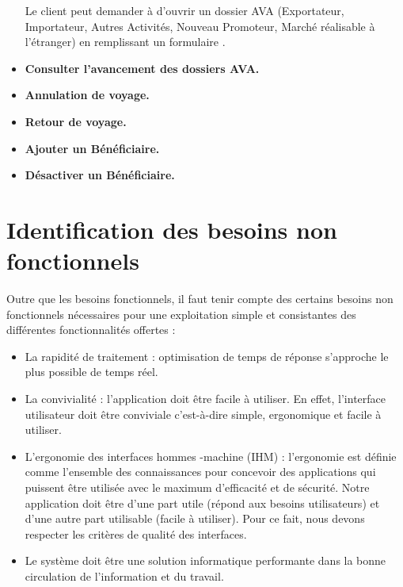 \begin{itemize}
Le client peut  demander à d'ouvrir un dossier AVA (Exportateur, Importateur, Autres Activités, Nouveau Promoteur, Marché réalisable à l'étranger) en remplissant un formulaire .

\item \textbf{Consulter l'avancement des dossiers AVA.}

\item \textbf{Annulation de voyage.} 

\item \textbf{Retour de voyage.} 

\item \textbf{Ajouter un Bénéficiaire.}

\item \textbf{Désactiver un Bénéficiaire.}


\end{itemize}
 
 \section{Identification des besoins non fonctionnels} 
 Outre que les besoins fonctionnels, il faut tenir compte des certains besoins non fonctionnels nécessaires pour une exploitation simple et consistantes des différentes fonctionnalités offertes :
 
 \begin{itemize}
 \item La rapidité de traitement : optimisation de temps de réponse s'approche le plus possible de temps réel.
 
 \item La convivialité : l'application doit être facile à utiliser. En effet, l'interface utilisateur doit être conviviale c'est-à-dire simple, ergonomique et facile à utiliser.
 
 \item L'ergonomie des interfaces hommes -machine (IHM) : l'ergonomie est définie comme l'ensemble des connaissances pour concevoir des applications qui puissent être utilisée avec le maximum d'efficacité et de sécurité. Notre application doit être d'une part utile (répond aux besoins utilisateurs) et d'une autre part utilisable (facile à utiliser).
 Pour ce fait, nous devons respecter les critères de qualité des interfaces.

\item Le système doit être une solution informatique performante dans la bonne circulation de l'information et du travail.
 
 \end{itemize}
